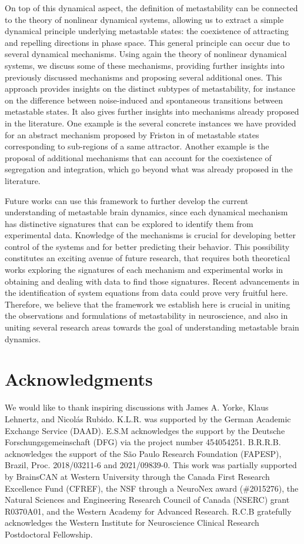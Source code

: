 \documentclass[reprint,superscriptaddress,showpacs,amsmath,amssymb,aps,floatfix,nolongbibliography]{revtex4-2}
\theoremstyle{definition}
\begin{document}
On top of this dynamical aspect, the definition of metastability can be connected to the theory of nonlinear dynamical systems, allowing us to extract a simple dynamical principle underlying metastable states: the coexistence of attracting and repelling directions in phase space.  This general principle can occur due to several dynamical mechanisms. Using again the theory of nonlinear dynamical systems, we discuss some of these mechanisms, providing further insights into previously discussed mechanisms and proposing several additional ones. This approach provides insights on the distinct subtypes of metastability, for instance on the difference between noise-induced and spontaneous transitions between metastable states. It also gives further insights into mechanisms already proposed in the literature. One example is the several concrete instances we have provided for an abstract mechanism proposed by Friston in \cite{friston2000transients} of metastable states corresponding to sub-regions of a same attractor. Another example is the proposal of additional mechanisms that can account for the coexistence of segregation and integration, which go beyond what was already proposed in the literature. 

Future works can use this framework to further develop the current understanding of metastable brain dynamics, since each dynamical mechanism has distinctive signatures that can be explored to identify them from experimental data. Knowledge of the mechanisms is crucial for developing better control of the systems and for better predicting their behavior. This possibility constitutes an exciting avenue of future research, that requires both theoretical works exploring the signatures of each mechanism and experimental works in obtaining and dealing with data to find those signatures. Recent advancements in the identification of system equations from data \cite{voss2004nonlinear, brunton2016discovering, tabar2019analysis, anvari2016disentangling} could prove very fruitful here. Therefore, we believe that the framework we establish here is crucial in uniting the observations and formulations of metastability in neuroscience, and also in uniting several research areas towards the goal of understanding metastable brain dynamics. 


\section*{Acknowledgments}
We would like to thank inspiring discussions with James A. Yorke, Klaus Lehnertz, and Nicolás Rubido. K.L.R. was supported by the German Academic Exchange Service (DAAD). E.S.M acknowledges the support by the Deutsche Forschungsgemeinschaft (DFG) via the project number 454054251. B.R.R.B. acknowledges the support of the São Paulo Research Foundation (FAPESP), Brazil, Proc. 2018/03211-6 and 2021/09839-0. This work was partially supported by BrainsCAN at Western University through the Canada First Research Excellence Fund (CFREF), the NSF through a NeuroNex award (\#2015276), the Natural Sciences and Engineering Research Council of Canada (NSERC) grant R0370A01, and the Western Academy for Advanced Research. R.C.B gratefully acknowledges the Western Institute for Neuroscience Clinical Research Postdoctoral Fellowship.
\end{document}
